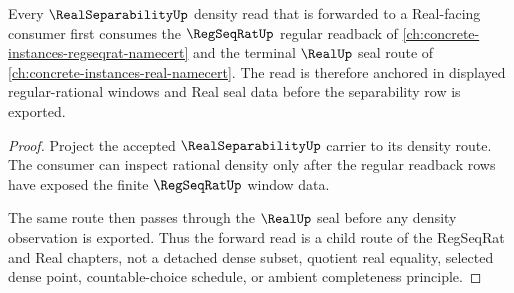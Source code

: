 \begin{theorem}
\label{thm:real-separability-regseqrat-forward-anchor}
Every $\RealSeparabilityUp$ density read that is forwarded to a Real-facing consumer first consumes the $\RegSeqRatUp$ regular readback of \autoref{ch:concrete-instances-regseqrat-namecert} and the terminal $\RealUp$ seal route of \autoref{ch:concrete-instances-real-namecert}. The read is therefore anchored in displayed regular-rational windows and Real seal data before the separability row is exported.
\end{theorem}
\begin{proof}
Project the accepted $\RealSeparabilityUp$ carrier to its density route. The consumer can inspect rational density only after the regular readback rows have exposed the finite $\RegSeqRatUp$ window data.

The same route then passes through the $\RealUp$ seal before any density observation is exported. Thus the forward read is a child route of the RegSeqRat and Real chapters, not a detached dense subset, quotient real equality, selected dense point, countable-choice schedule, or ambient completeness principle.
\end{proof}
